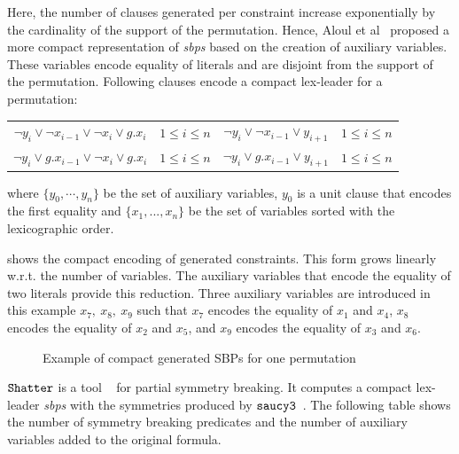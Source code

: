 Here, the number of clauses generated per constraint increase exponentially by the 
cardinality of the support  of the permutation. Hence, Aloul et al~\cite{aloul06} proposed a more compact representation of \textit{sbps} based on the creation of auxiliary variables.  
These variables encode equality of literals and are disjoint from the support of the permutation.
Following clauses encode a compact lex-leader for a permutation:


 
\begin{center}
\begin{tabular}{cc|cc}
 $\neg y_i \lor \neg x_{i-1} \lor \neg x_i \lor g.x_i$ & $1 \leq i \leq n$ & $ \neg y_i \lor \neg x_{i-1} \lor y_{i+1}$ & $1 \leq i \leq n$ \\
 $\neg y_i \lor  g.x_{i-1} \lor \neg x_i \lor g.x_i$ & $1 \leq i \leq n$ & $ \neg y_i \lor g.x_{i-1} \lor  y_{i+1}$ & $1 \leq i \leq n$ \\
 
\end{tabular}
\end{center}
where $\{y_0,\cdots, y_{n} \}$ be the set of auxiliary variables, $y_0$ is a unit clause that encodes the first equality and $\{x_1,...,x_n\}$ be the set of variables sorted with the lexicographic order.


 shows the compact encoding of generated constraints. This form grows linearly w.r.t. the number of variables.
The auxiliary variables that encode the equality of two literals provide this reduction. 
Three auxiliary variables are introduced in this example $x_7,\ x_8,\ x_9$ such that $x_7$ encodes the equality of $x_1$ and $x_4$, $x_8$ encodes the equality of $x_2$ and $x_5$, and $x_9$ encodes the equality of $x_3$ and $x_6$.

 \begin{figure}[!htbp]
 
 \caption{Example of compact generated SBPs for one permutation}
 \label{fig:esbp_compact_gen}
\end{figure}

$\texttt{Shatter}$ is a tool ~\cite{aloul06} for partial symmetry breaking.
It computes a compact lex-leader \textit{sbps} with the symmetries produced by $\texttt{saucy3}$~\cite{katebi2010symmetry}.
The following table shows the number of symmetry breaking predicates and the
number of auxiliary variables added to the original formula.


